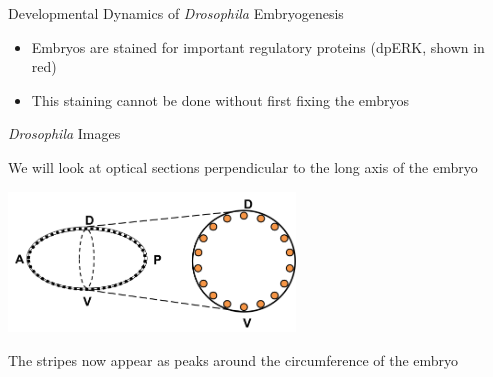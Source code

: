 \documentclass[10pt]{beamer}
\begin{document}
\begin{frame}{Developmental Dynamics of {\em Drosophila} Embryogenesis}
\begin{center}
\end{center}

\begin{itemize}
\item Embryos are stained for important regulatory proteins (dpERK, shown in red) 

\item This staining cannot be done without first fixing the embryos
\end{itemize}

\end{frame}

\begin{frame}{{\em Drosophila} Images}

\begin{center}
We will look at optical sections perpendicular to the long axis of the embryo

\includegraphics[width=3in]{drosophila_schematic}


The stripes now appear as peaks around the circumference of the embryo

\end{center}

\end{frame}
\end{document}
